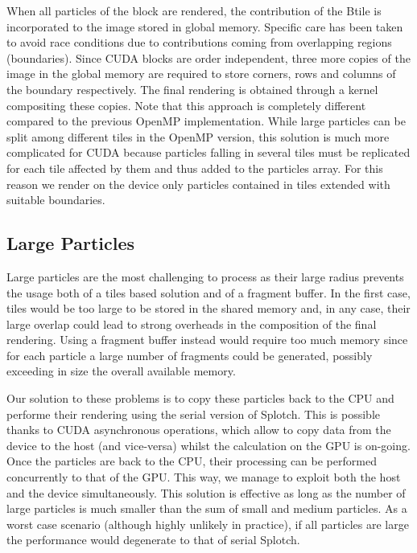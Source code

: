 \documentclass[1p]{elsarticle}
\begin{document}
When all particles of the block are rendered, the contribution of the Btile is incorporated to the image stored in global memory. Specific care has been taken to avoid race conditions due to contributions coming
from overlapping regions (boundaries). Since CUDA blocks are order independent, three more copies of the image in the global memory are required to store corners, rows and columns of the boundary respectively. The final rendering is obtained through a kernel compositing these copies. Note that this approach is completely different compared to the previous OpenMP implementation. While large particles can be split among different tiles in the OpenMP version, this solution is much more complicated for CUDA because particles falling in several tiles must be replicated for each tile affected by them and thus added to the particles array. For this reason we render on the device only particles contained in tiles extended with suitable boundaries. 

\subsection{Large Particles}
\label{sec:largeparticles}
Large particles are the most challenging to process as their large
radius prevents the usage both of a tiles based solution and of a fragment buffer.
In the first case, tiles would be too large to be stored in the shared memory
and, in any case, their large overlap could lead to strong overheads in the composition of the
final rendering. Using a fragment buffer instead would require too much memory since
for each particle a large number of fragments could be generated, possibly
exceeding in size the overall available memory.

Our solution to these problems is to copy these particles back to the CPU and performe their rendering
using the serial version of Splotch. This is possible thanks to CUDA asynchronous
operations, which allow to copy data from the device to the host (and vice-versa)
whilst the calculation on the GPU is on-going. Once the particles are back to the CPU,
their processing can be performed concurrently to that of the GPU.  
This way, we manage to exploit both the host and the device simultaneously.
This solution is effective as long as the number of large particles
is much smaller than the sum of small and medium particles. As a worst case scenario (although highly unlikely in practice), if all particles are large the performance would degenerate to that of serial Splotch.
\end{document}
